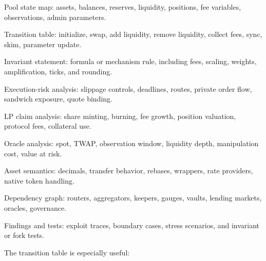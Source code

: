 \begin{artifactbox}
\begin{artifactchecklist}
\item Pool state map: assets, balances, reserves, liquidity, positions, fee variables, observations, admin parameters.
\item Transition table: initialize, swap, add liquidity, remove liquidity, collect fees, sync, skim, parameter update.
\item Invariant statement: formula or mechanism rule, including fees, scaling, weights, amplification, ticks, and rounding.
\item Execution-risk analysis: slippage controls, deadlines, routes, private order flow, sandwich exposure, quote binding.
\item LP claim analysis: share minting, burning, fee growth, position valuation, protocol fees, collateral use.
\item Oracle analysis: spot, TWAP, observation window, liquidity depth, manipulation cost, value at risk.
\item Asset semantics: decimals, transfer behavior, rebases, wrappers, rate providers, native token handling.
\item Dependency graph: routers, aggregators, keepers, gauges, vaults, lending markets, oracles, governance.
\item Findings and tests: exploit traces, boundary cases, stress scenarios, and invariant or fork tests.
\end{artifactchecklist}
\end{artifactbox}

The transition table is especially useful:

